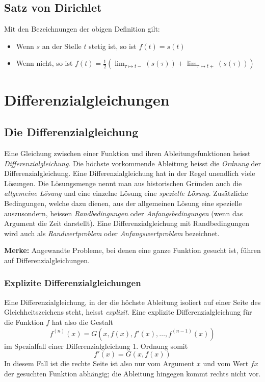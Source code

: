 \documentclass[10pt,a4paper]{scrartcl}
\begin{document}
\subsection{Satz von Dirichlet}

Mit den Bezeichnungen der obigen Definition gilt:
\begin{itemize}
\item Wenn $s$ an der Stelle $t$ stetig ist, so ist $f(t) = s(t)$
\item Wenn nicht, so ist $\displaystyle f(t) = \frac{1}{2} \left(\lim_{\tau
    \mapsto t-}(s(\tau)) + \lim_{\tau \mapsto t+}(s(\tau))\right)$
\end{itemize}


\section{Differenzialgleichungen}


\subsection{Die Differenzialgleichung}

Eine Gleichung zwischen einer Funktion und ihren Ableitungsfunktionen heisst
\emph{Differenzialgleichung}. Die höchste vorkommende Ableitung heisst die
\emph{Ordnung} der Differenzialgleichung. Eine Differenzialgleichung hat in der
Regel unendlich viele Lösungen. Die Lösungsmenge nennt man aus historischen
Gründen auch die \emph{allgemeine Lösung} und eine einzelne Lösung eine
\emph{spezielle Lösung}.  Zusätzliche Bedingungen, welche dazu dienen, aus der
allgemeinen Lösung eine spezielle auszusondern, heissen \emph{Randbedingungen}
oder \emph{Anfangsbedingungen} (wenn das Argument die Zeit darstellt). Eine
Differenzialgleichung mit Randbedingungen wird auch als \emph{Randwertproblem}
oder \emph{Anfangswertproblem} bezeichnet.

\textbf{Merke:} Angewandte Probleme, bei denen eine ganze Funktion gesucht ist,
führen auf Differenzialgleichungen.


\subsubsection{Explizite Differenzialgleichungen}

Eine Differenzialgleichung, in der die höchste Ableitung isoliert auf einer
Seite des Gleichheitszeichens steht, heisst \emph{explizit}. Eine explizite
Differenzialgleichung für die Funktion $f$ hat also die Gestalt
$$f^{(n)}(x) = G\left(x,f(x),f'(x),\dotsc,f^{(n-1)}(x)\right)$$
im Spezialfall einer Differenzialgleichung 1. Ordnung somit
$$f'(x) = G(x,f(x))$$
In diesem Fall ist die rechte Seite ist also nur vom Argument $x$ und vom Wert
$fx$ der gesuchten Funktion abhängig; die Ableitung hingegen kommt rechts nicht
vor.
\end{document}
